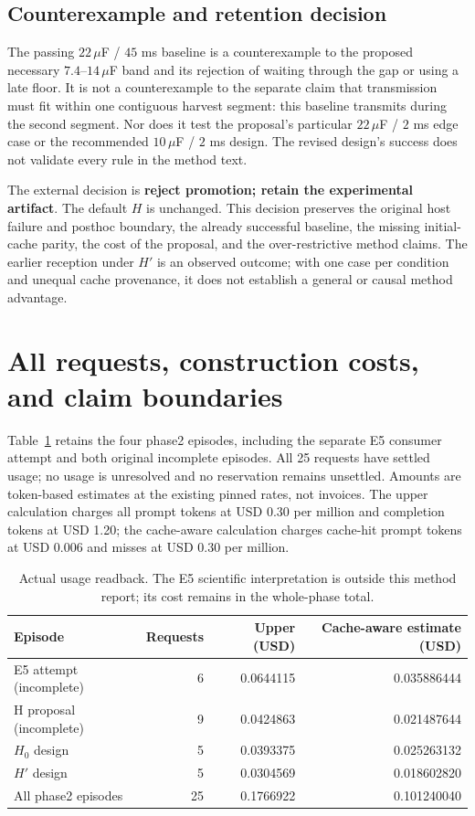 \subsection{Counterexample and retention decision}
The passing $22\,\mu$F / $45$ ms baseline is a counterexample to the proposed
necessary $7.4$--$14\,\mu$F band and its rejection of waiting through the gap
or using a late floor. It is not a counterexample to the separate claim that
transmission must fit within one contiguous harvest segment: this baseline
transmits during the second segment. Nor does it test the proposal's particular
$22\,\mu$F / $2$ ms edge case or the recommended $10\,\mu$F / $2$ ms design.
The revised design's success does not validate every rule in the method text.

The external decision is \textbf{reject promotion; retain the experimental
artifact}. The default $H$ is unchanged. This decision preserves the original
host failure and posthoc boundary, the already successful baseline, the missing
initial-cache parity, the cost of the proposal, and the over-restrictive method
claims. The earlier reception under $H'$ is an observed outcome; with one
case per condition and unequal cache provenance, it does not establish a
general or causal method advantage.

\clearpage
\section{All requests, construction costs, and claim boundaries}
Table~\ref{tab:costs} retains the four phase2 episodes, including the separate
E5 consumer attempt and both original incomplete episodes. All 25
requests have settled usage; no usage is unresolved and no reservation remains
unsettled. Amounts are token-based estimates at the existing pinned rates,
not invoices. The upper calculation charges all prompt tokens at USD 0.30 per
million and completion tokens at USD 1.20; the cache-aware calculation charges
cache-hit prompt tokens at USD 0.006 and misses at USD 0.30 per million.

\begin{table}[h]
\centering
\begin{tabular}{@{}lrrr@{}}
\toprule
Episode & Requests & Upper (USD) & Cache-aware estimate (USD) \\
\midrule
E5 attempt (incomplete) & 6 & 0.0644115 & 0.035886444 \\
H proposal (incomplete) & 9 & 0.0424863 & 0.021487644 \\
$H_0$ design & 5 & 0.0393375 & 0.025263132 \\
$H'$ design & 5 & 0.0304569 & 0.018602820 \\
\midrule
All phase2 episodes & 25 & 0.1766922 & 0.101240040 \\
\bottomrule
\end{tabular}
\caption{Actual usage readback. The E5 scientific interpretation is outside this
method report; its cost remains in the whole-phase total.}
\label{tab:costs}
\end{table}

